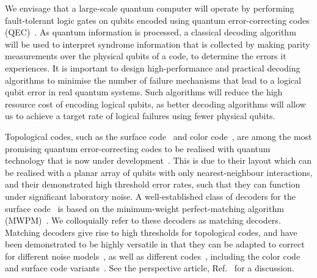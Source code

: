 \documentclass[a4paper,twocolumn,11pt,accepted=2024-12-23]{quantumarticle}
\begin{document}
We envisage that a large-scale quantum computer will operate by performing fault-tolerant logic gates on qubits encoded using quantum error-correcting codes (QEC)~\cite{shor1995scheme, shor1996fault, calderbank1996good, terhal2015quantum, brown2016quantum, campbell2017roads}. As quantum information is processed, a classical decoding algorithm~\cite{dennis2002topological, duclos2010fast, wootton2012high, Anwar14, hutter2014efficient, Torlai2017neural, panteleev2021degenerate, Delfosse2021almostlineartime} will be used to interpret syndrome information that is collected by making parity measurements over the physical qubits of a code, to determine the errors it experiences. It is important to design high-performance and practical decoding algorithms to minimise the number of failure mechanisms that lead to a logical qubit error in real quantum systems. Such algorithms will reduce the high resource cost of encoding logical qubits, as better decoding algorithms will allow us to achieve a target rate of logical failures using fewer physical qubits. 

Topological codes, such as the surface code~\cite{kitaev2003fault, bravyi1998quantum, dennis2002topological, Fowler12surface} and color code~\cite{bombin2006topological, bombin2007topological, Bombin_2015_gauge, Kubica2015universal}, are among the most promising quantum error-correcting codes to be realised with quantum technology that is now under development~\cite{Egan2021fault, Ryan-Anderson2021realization, Krinner2022realizing, Sundaresan2023demonstrating, google2023suppressing, gupta2023encoding}. This is due to their layout which can be realised with a planar array of qubits with only nearest-neighbour interactions, and their demonstrated high threshold error rates, such that they can function under significant laboratory noise. A well-established class of decoders for the surface code~\cite{dennis2002topological, wang2003confinement, Raussendorf2007fault,  Fowler12surface} is based on the minimum-weight perfect-matching algorithm (MWPM)~\cite{edmonds1965paths, dennis2002topological, higgott2023sparse}. We colloquially refer to these decoders as matching decoders. Matching decoders give rise to high thresholds for topological codes, and have been demonstrated to be highly versatile in that they can be adapted to correct for different noise models~\cite{Fowler2013coping, Fowler2014quantifying,  Hutter2014breakdown, Nickerson2019analysingcorrelated, tuckett2020fault, bonilla2021xzzx, Strikis21, siegel2022adaptive, lin2023empirical}, as well as different codes~\cite{brown2020parallelized, nixon2021correcting, Miguel2023cellularautomaton}, including the color code~\cite{Wang2010graphical, delfosse2014decoding, Chamberland_2020, Beverland2021cost, sahay2022decoder, kubica2023efficient} and surface code variants~\cite{Raussendorf2005long, Higgott2021, Gidney2022benchmarkingplanar, Paetznick2023performance, kesselring2022anyon}. See the perspective article, Ref.~\cite{brown2022conservation} for a discussion.
\end{document}
